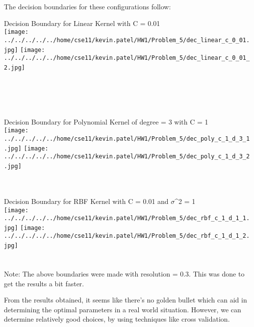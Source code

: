 \documentclass[twoside,10pt,a4paper]{article}
\theoremstyle{definition}
\theoremstyle{definition}
\theoremstyle{remark}
\renewcommand{\>}{{\rightarrow}}
\newcommand{\1}{{\mathbf 1}}
\newcommand{\0}{{\mathbf 0}}
\begin{document}
The decision boundaries for these configurations follow:
~\\
\begin{center}
Decision Boundary for Linear Kernel with C = 0.01 \\
\texttt{[image: ../../../../../home/cse11/kevin.patel/HW1/Problem\_5/dec\_linear\_c\_0\_01.jpg]}
\texttt{[image: ../../../../../home/cse11/kevin.patel/HW1/Problem\_5/dec\_linear\_c\_0\_01\_2.jpg]}
~\\~\\~\\~\\~\\
\end{center}
\begin{center}
Decision Boundary for Polynomial Kernel of degree = 3 with C = 1 \\
\texttt{[image: ../../../../../home/cse11/kevin.patel/HW1/Problem\_5/dec\_poly\_c\_1\_d\_3\_1.jpg]}
\texttt{[image: ../../../../../home/cse11/kevin.patel/HW1/Problem\_5/dec\_poly\_c\_1\_d\_3\_2.jpg]}
~\\~\\~\\
\end{center}
\begin{center}
Decision Boundary for RBF Kernel with C = 0.01 and $\sigma$^2 = 1\\
\texttt{[image: ../../../../../home/cse11/kevin.patel/HW1/Problem\_5/dec\_rbf\_c\_1\_d\_1\_1.jpg]}
\texttt{[image: ../../../../../home/cse11/kevin.patel/HW1/Problem\_5/dec\_rbf\_c\_1\_d\_1\_2.jpg]}
~\\~\\~\\
Note: The above boundaries were made with resolution = 0.3. This was done to get the results a bit faster.
\end{center}

From the results obtained, it seems like there's no golden bullet which can aid in determining the optimal parameters in a real world situation. However, we can determine relatively good choices, by using techniques like cross validation.\\
\end{document}

